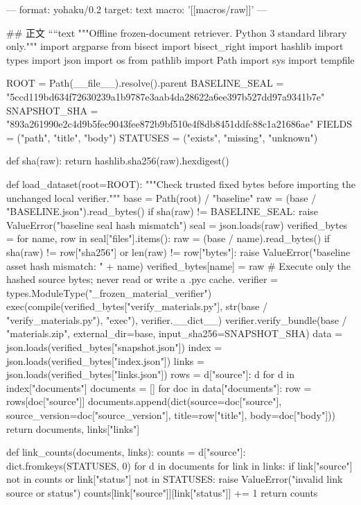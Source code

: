 ---
format: yohaku/0.2
target: text
macro: '[[macros/raw]]'
---

## 正文
````text
"""Offline frozen-document retriever. Python 3 standard library only."""
import argparse
from bisect import bisect_right
import hashlib
import types
import json
import os
from pathlib import Path
import sys
import tempfile

ROOT = Path(__file__).resolve().parent
BASELINE_SEAL = "5ccd119bd634f72630239a1b9787e3aab4da28622a6ee397b527dd97a9341b7e"
SNAPSHOT_SHA = "893a261990e2c4d9b5fec9043fee872b9bf510e4f8db8451ddfc88c1a21686ae"
FIELDS = ("path", "title", "body")
STATUSES = ("exists", "missing", "unknown")

def sha(raw):
    return hashlib.sha256(raw).hexdigest()

def load_dataset(root=ROOT):
    """Check trusted fixed bytes before importing the unchanged local verifier."""
    base = Path(root) / "baseline"
    raw = (base / "BASELINE.json").read_bytes()
    if sha(raw) != BASELINE_SEAL:
        raise ValueError("baseline seal hash mismatch")
    seal = json.loads(raw)
    verified_bytes = {}
    for name, row in seal["files"].items():
        raw = (base / name).read_bytes()
        if sha(raw) != row["sha256"] or len(raw) != row["bytes"]:
            raise ValueError("baseline asset hash mismatch: " + name)
        verified_bytes[name] = raw
    # Execute only the hashed source bytes; never read or write a .pyc cache.
    verifier = types.ModuleType("_frozen_material_verifier")
    exec(compile(verified_bytes["verify_materials.py"], str(base / "verify_materials.py"), "exec"), verifier.__dict__)
    verifier.verify_bundle(base / "materials.zip", external_dir=base, input_sha256=SNAPSHOT_SHA)
    data = json.loads(verified_bytes["snapshot.json"])
    index = json.loads(verified_bytes["index.json"])
    links = json.loads(verified_bytes["links.json"])
    rows = {d["source"]: d for d in index["documents"]}
    documents = []
    for doc in data["documents"]:
        row = rows[doc["source"]]
        documents.append(dict(source=doc["source"], source_version=doc["source_version"],
                              title=row["title"], body=doc["body"]))
    return documents, links["links"]

def link_counts(documents, links):
    counts = {d["source"]: dict.fromkeys(STATUSES, 0) for d in documents}
    for link in links:
        if link["source"] not in counts or link["status"] not in STATUSES:
            raise ValueError("invalid link source or status")
        counts[link["source"]][link["status"]] += 1
    return counts

